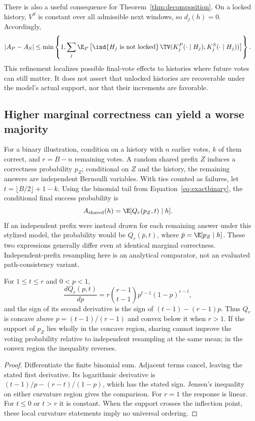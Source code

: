 There is also a useful consequence for Theorem~\ref{thm:decomposition}. On a locked history, $V^S$ is constant over all admissible next windows, so $d_j(h)=0$. Accordingly,
\[
 |A_P-A_S|\leq\min\left\{1,\sum_j\E_P\left[
 \ind\{H_j\text{ is not locked}\}\,
 \TV(K_j^P(\cdot\mid H_j),K_j^S(\cdot\mid H_j))\right]\right\}.
\]
This refinement localizes possible final-vote effects to histories where future votes can still matter. It does not assert that unlocked histories are recoverable under the model's actual support, nor that their increments are favorable.

\subsection{Higher marginal correctness can yield a worse majority}
For a binary illustration, condition on a history with $n$ earlier votes, $k$ of them correct, and $r=B-n$ remaining votes. A random shared prefix $Z$ induces a correctness probability $p_Z$; conditional on $Z$ and the history, the remaining answers are independent Bernoulli variables. With ties counted as failures, let $t=\lfloor B/2\rfloor+1-k$. Using the binomial tail from Equation~\ref{eq:exactbinary}, the conditional final success probability is
\begin{equation}
 A_{\mathrm{shared}}(h)=\E[Q_r(p_Z,t)\mid h].
 \label{eq:mixturevote}
\end{equation}
If an independent prefix were instead drawn for each remaining answer under this stylized model, the probability would be $Q_r(\bar p,t)$, where $\bar p=\E[p_Z\mid h]$. These two expressions generally differ even at identical marginal correctness. Independent-prefix resampling here is an analytical comparator, not an evaluated path-consistency variant.

\begin{proposition}
For $1\leq t\leq r$ and $0<p<1$,
\[
 \frac{d Q_r(p,t)}{dp}
 =r\binom{r-1}{t-1}p^{t-1}(1-p)^{r-t},
\]
and the sign of its second derivative is the sign of
$(t-1)-(r-1)p$. Thus $Q_r$ is concave above $p=(t-1)/(r-1)$ and convex below it when $r>1$. If the support of $p_Z$ lies wholly in the concave region, sharing cannot improve the voting probability relative to independent resampling at the same mean; in the convex region the inequality reverses.
\end{proposition}
\begin{proof}
Differentiate the finite binomial sum. Adjacent terms cancel, leaving the stated first derivative. Its logarithmic derivative is $(t-1)/p-(r-t)/(1-p)$, which has the stated sign. Jensen's inequality on either curvature region gives the comparison. For $r=1$ the response is linear. For $t\leq0$ or $t>r$ it is constant. When the support crosses the inflection point, these local curvature statements imply no universal ordering.
\end{proof}

